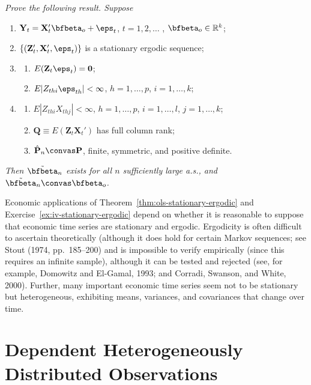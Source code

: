 \begin{exercises}
\item\label{ex:iv-stationary-ergodic} \emph{Prove the following result. Suppose}
\begin{enumerate}[label=(\roman*)]
\item $\mathbf{Y}_t = \mathbf{X}_t' \bfbeta_o + \eps_t$, \quad $t = 1, 2, \ldots$ , $\bfbeta_o \in \mathbb{R}^k$;
\item $\{(\mathbf{Z}_t', \mathbf{X}_t', \eps_t)\}$ is a stationary ergodic sequence;
\item \begin{enumerate}[label=(\alph*)]
\item $E(\mathbf{Z}_t \eps_t) = \mathbf{0}$;
\item $E|Z_{thi} \eps_{th}| < \infty$, $h = 1, \ldots, p$, $i = 1, \ldots, k$;
\end{enumerate}
\item \begin{enumerate}[label=(\alph*)]
\item $E|Z_{thi} X_{thj}| < \infty$, $h = 1, \ldots, p$, $i = 1, \ldots, l$, $j = 1, \ldots, k$;
\item $\mathbf{Q} \equiv E(\mathbf{Z}_t \mathbf{X}_t')$ has full column rank;
\item $\hat{\mathbf{P}}_n \convas \mathbf{P}$, finite, symmetric, and positive definite.
\end{enumerate}
\end{enumerate}
\emph{Then $\tilde{\bfbeta}_n$ exists for all $n$ sufficiently large a.s., and $\tilde{\bfbeta}_n \convas \bfbeta_o$.}
\end{exercises}

Economic applications of Theorem~\ref{thm:ols-stationary-ergodic} and Exercise~\ref{ex:iv-stationary-ergodic} depend on whether it is reasonable to suppose that economic time series are stationary and ergodic. Ergodicity is often difficult to ascertain theoretically (although it does hold for certain Markov sequences; see Stout (1974, pp.~185--200) and is impossible to verify empirically (since this requires an infinite sample), although it can be tested and rejected (see, for example, Domowitz and El-Gamal, 1993; and Corradi, Swanson, and White, 2000). Further, many important economic time series seem not to be stationary but heterogeneous, exhibiting means, variances, and covariances that change over time.

\section{Dependent Heterogeneously Distributed Observations}\label{sec:lln-dep-het}


